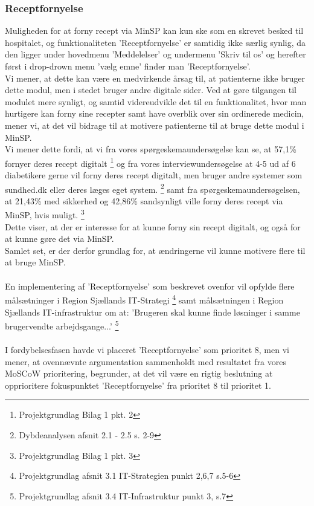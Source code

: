\subsubsection{Receptfornyelse}
Muligheden for at forny recept via MinSP kan kun ske som en skrevet besked til hospitalet, og funktionaliteten 'Receptfornyelse' er samtidig ikke særlig synlig, da den ligger under hovedmenu 'Meddelelser' og undermenu 'Skriv til os' og herefter først i drop-drown menu 'vælg emne' finder man 'Receptfornyelse'.\\
Vi mener, at dette kan være en medvirkende årsag til, at patienterne ikke bruger dette modul, men i stedet bruger andre digitale sider. Ved at gøre tilgangen til modulet mere synligt, og samtid videreudvikle det til en funktionalitet, hvor man hurtigere kan forny sine recepter samt have overblik over sin ordinerede medicin, mener vi, at det vil bidrage til at motivere patienterne til at bruge dette modul i MinSP.\\
Vi mener dette fordi, at vi fra vores spørgeskemaundersøgelse kan se, at 57,1\% fornyer deres recept digitalt \footnote{Projektgrundlag Bilag 1 pkt. 2} og fra vores interviewundersøgelse at 4-5 ud af 6 diabetikere gerne vil forny deres recept digitalt, men bruger andre systemer som sundhed.dk eller deres læges eget system. \footnote{Dybdeanalysen afsnit 2.1 - 2.5 s. 2-9} samt fra spørgeskemaundersøgelsen, at 21,43\% med sikkerhed og 42,86\% sandsynligt ville forny deres recept via MinSP, hvis muligt. \footnote{Projektgrundlag Bilag 1 pkt. 3} \\
Dette viser, at der er interesse for at kunne forny sin recept digitalt, og også for at kunne gøre det via MinSP.\\
Samlet set, er der derfor grundlag for, at ændringerne vil kunne motivere flere til at bruge MinSP.\\
\\
En implementering af 'Receptfornyelse' som beskrevet ovenfor vil opfylde flere målsætninger i Region Sjællands IT-Strategi \footnote{Projektgrundlag afsnit 3.1 IT-Strategien punkt 2,6,7 s.5-6} samt målsætningen i Region Sjællands IT-infrastruktur om at: 'Brugeren skal kunne finde løsninger i samme brugervendte arbejdsgange...' \footnote{Projektgrundlag afsnit 3.4 IT-Infrastruktur punkt 3, s.7}\\
\\
I fordybelsesfasen havde vi placeret 'Receptfornyelse' som prioritet 8, men vi mener, at ovennævnte argumentation sammenholdt med resultatet fra vores MoSCoW prioritering, begrunder, at det vil være en rigtig beslutning at opprioritere fokuspunktet 'Receptfornyelse' fra prioritet 8 til prioritet 1.
